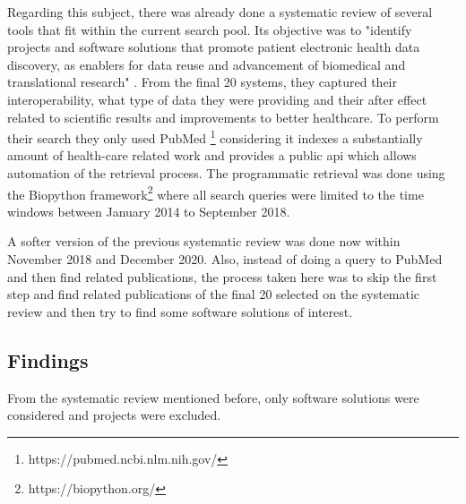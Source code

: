 Regarding this subject, there was already done a systematic review of several tools
that fit within the current search pool.
Its objective was to "identify projects and software solutions that promote patient
electronic health data discovery, as enablers for data reuse and advancement of
biomedical and translational research" \cite{systematic_review}.
From the final 20 systems, they captured their interoperability, what type of data they
were providing and their after effect related to scientific results and improvements to
better healthcare.
To perform their search they only used PubMed
\footnote{https://pubmed.ncbi.nlm.nih.gov/} considering it indexes a substantially
amount of health-care related work and provides a public \gls{api} which allows
automation of the retrieval process.
The programmatic retrieval was done using the Biopython
framework\footnote{https://biopython.org/} where all search queries were limited to the
time windows between January 2014 to September 2018.

A softer version of the previous systematic review was done now within November 2018
and December 2020.
Also, instead of doing a query to PubMed and then find related publications, the
process taken here was to skip the first step and find related publications of the
final 20 selected on the systematic review and then try to find some software solutions
of interest.

\subsection{Findings}

From the systematic review mentioned before, only software solutions were considered
and projects were excluded.

